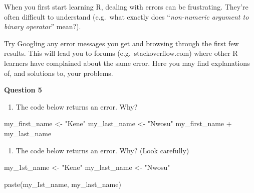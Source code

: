 \documentclass[
  letterpaper,
  DIV=11,
  numbers=noendperiod]{scrreprt}
\newenvironment{Shaded}{\begin{snugshade}}{\end{snugshade}}
\newcommand{\FunctionTok}[1]{\textcolor[rgb]{0.28,0.35,0.67}{#1}}
\newcommand{\NormalTok}[1]{\textcolor[rgb]{0.00,0.23,0.31}{#1}}
\newcommand{\OtherTok}[1]{\textcolor[rgb]{0.00,0.23,0.31}{#1}}
\newcommand{\SpecialCharTok}[1]{\textcolor[rgb]{0.37,0.37,0.37}{#1}}
\newcommand{\StringTok}[1]{\textcolor[rgb]{0.13,0.47,0.30}{#1}}
\providecommand{\tightlist}{%
  \setlength{\itemsep}{0pt}\setlength{\parskip}{0pt}}\usepackage{longtable,booktabs,array}
\begin{document}
When you first start learning R, dealing with errors can be frustrating.
They're often difficult to understand (e.g.~what exactly does
``\emph{non-numeric argument to binary operator}'' mean?).

Try Googling any error messages you get and browsing through the first
few results. This will lead you to forums (e.g.~stackoverflow.com) where
other R learners have complained about the same error. Here you may find
explanations of, and solutions to, your problems.

\begin{tcolorbox}[enhanced jigsaw, titlerule=0mm, colback=white, left=2mm, breakable, opacitybacktitle=0.6, colbacktitle=quarto-callout-tip-color!10!white, colframe=quarto-callout-tip-color-frame, bottomtitle=1mm, opacityback=0, coltitle=black, arc=.35mm, toptitle=1mm, title=\textcolor{quarto-callout-tip-color}{\faLightbulb}\hspace{0.5em}{Practice}, leftrule=.75mm, toprule=.15mm, bottomrule=.15mm, rightrule=.15mm]

\textbf{Question 5}

\begin{enumerate}
\def\labelenumi{\alph{enumi}.}
\tightlist
\item
  The code below returns an error. Why?
\end{enumerate}

\begin{Shaded}
\begin{Highlighting}[]
\NormalTok{my\_first\_name }\OtherTok{\textless{}{-}} \StringTok{"Kene"}
\NormalTok{my\_last\_name }\OtherTok{\textless{}{-}} \StringTok{"Nwosu"}
\NormalTok{my\_first\_name }\SpecialCharTok{+}\NormalTok{ my\_last\_name}
\end{Highlighting}
\end{Shaded}

\begin{enumerate}
\def\labelenumi{\alph{enumi}.}
\setcounter{enumi}{1}
\tightlist
\item
  The code below returns an error. Why? (Look carefully)
\end{enumerate}

\begin{Shaded}
\begin{Highlighting}[]
\NormalTok{my\_1st\_name }\OtherTok{\textless{}{-}} \StringTok{"Kene"}
\NormalTok{my\_last\_name }\OtherTok{\textless{}{-}} \StringTok{"Nwosu"}

\FunctionTok{paste}\NormalTok{(my\_Ist\_name, my\_last\_name)}
\end{Highlighting}
\end{Shaded}

\end{tcolorbox}
\end{document}
